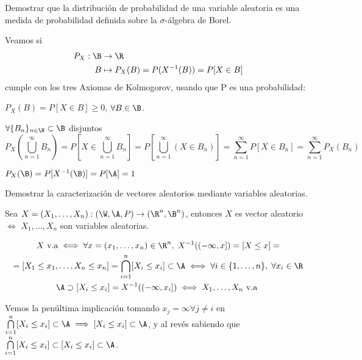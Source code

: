 \begin{ejer}
  Demostrar que la distribución de probabilidad de una variable aleatoria es una medida de probabilidad definida sobre la $\sigma$-álgebra de Borel.
\end{ejer}

\begin{sol}
  Veamos si
  \begin{align*}
    P_X : \B & \to \R \\
    B & \mapsto P_X(B) = P(X^{-1}(B)) = P[X \in B]
  \end{align*}
  cumple con los tres Axiomas de Kolmogorov, usando que P es una probabilidad:

  \begin{nlist}
    \item $P_X(B) = P[X \in B] \geq 0$, $\forall B \in \B$.
    \item $\forall \{B_n\}_{n \in \N} \subset \B$ disjuntos $$ P_X(\bigcup \limits^\infty_{n = 1} B_n) = P[X \in \bigcup \limits^\infty_{n = 1} B_n] = P[\bigcup \limits^\infty_{n = 1} (X \in B_n)] = \sum \limits^\infty_{n = 1} P[X \in B_n] = \sum \limits^\infty_{n = 1} P_X(B_n)$$
    \item $P_X(\B) = P[X^{-1}(\B)] = P[\A] = 1$
  \end{nlist}
\end{sol}

\begin{ejer}
  Demostrar la caracterización de vectores aleatorios mediante variables aleatorias.
\end{ejer}

\begin{sol}
  Sea $X = (X_1, \ldots, X_n) : (\W, \A, P) \to (\R^n, \B^n)$, entonces $X$ es vector aleatorio $\iff$ $X_1, \ldots, X_n$ son variables aleatorias.

  \begin{multline*}
    X \text{ v.a} \iff \forall x = (x_1, \ldots, x_n) \in \R^n, \; X^{-1}((-\infty, x]) = [X \leq x] = \\ =  [X_1 \leq x_1, \ldots, X_n \leq x_n] = \bigcap \limits^n_{i = 1} [X_i \leq x_i] \subset \A \iff \forall i \in \{1, \ldots, n\}, \; \forall x_i \in \R \\ \A \supset [X_i \leq x_i] = X^{-1}((-\infty, x_i]) \iff X_1, \ldots, X_n \text{ v.a }
  \end{multline*}

  Vemos la penúltima implicación tomando $x_j = \infty \forall j \neq i$ en $\bigcap \limits^n_{i = 1} [X_i \leq x_i] \subset \A \implies [X_i \leq x_i] \subset \A$, y al revés sabiendo que $\bigcap \limits^n_{i = 1} [X_i \leq x_i] \subset [X_i \leq x_i] \subset \A$.
\end{sol}

